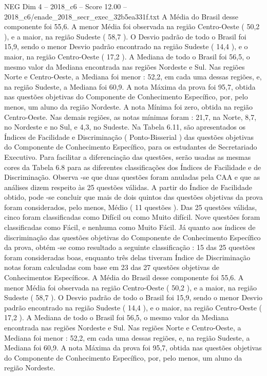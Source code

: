 \begin{textsample}{NEG Dim 4 – 2018\_c6 – Score 12.00 – 2018\_c6/enade\_2018\_secr\_exec\_32b5ea331f.txt}
A Média do Brasil desse componente foi 55,6.
A menor Média foi observada na região Centro-Oeste ( 50,2 ), e a maior, na região Sudeste ( 58,7 ).
O Desvio padrão de todo o Brasil foi 15,9, sendo o menor Desvio padrão encontrado na região Sudeste ( 14,4 ), e o maior, na região Centro-Oeste ( 17,2 ).
A Mediana de todo o Brasil foi 56,5, o mesmo valor da Mediana encontrada nas regiões Nordeste e Sul.
Nas regiões Norte e Centro-Oeste, a Mediana foi menor : 52,2, em cada uma dessas regiões, e, na região Sudeste, a Mediana foi 60,9.
A nota Máxima da prova foi 95,7, obtida nas questões objetivas do Componente de Conhecimento Específico, por, pelo menos, um aluno da região Nordeste.
A nota Mínima foi zero, obtida na região Centro-Oeste.
Nas demais regiões, as notas mínimas foram : 21,7, na Norte, 8,7, no Nordeste e no Sul, e 4,3, no Sudeste.
Na Tabela 6.11, são apresentados os Índices de Facilidade e Discriminação ( Ponto-Bisserial ) das questões objetivas do Componente de Conhecimento Específico, para os estudantes de Secretariado Executivo.
Para facilitar a diferenciação das questões, serão usadas as mesmas cores da Tabela 6.8 para as diferentes classificações dos Índices de Facilidade e de Discriminação.
Observa -se que duas questões foram anuladas pela CAA e que as análises dizem respeito às 25 questões válidas.
A partir do Índice de Facilidade obtido, pode -se concluir que mais de dois quintos das questões objetivas da prova foram considerados, pelo menos, Médio ( 11 questões ).
Das 25 questões válidas, cinco foram classificadas como Difícil ou como Muito difícil.
Nove questões foram classificadas como Fácil, e nenhuma como Muito Fácil.
Já quanto aos índices de discriminação das questões objetivas do Componente de Conhecimento Específico da prova, obtém -se como resultado a seguinte classificação : 15 das 25 questões foram consideradas boas, enquanto três delas tiveram Índice de Discriminação notas foram calculadas com base em 23 das 27 questões objetivas de Conhecimentos Específicos.
A Média do Brasil desse componente foi 55,6.
A menor Média foi observada na região Centro-Oeste ( 50,2 ), e a maior, na região Sudeste ( 58,7 ).
O Desvio padrão de todo o Brasil foi 15,9, sendo o menor Desvio padrão encontrado na região Sudeste ( 14,4 ), e o maior, na região Centro-Oeste ( 17,2 ).
A Mediana de todo o Brasil foi 56,5, o mesmo valor da Mediana encontrada nas regiões Nordeste e Sul.
Nas regiões Norte e Centro-Oeste, a Mediana foi menor : 52,2, em cada uma dessas regiões, e, na região Sudeste, a Mediana foi 60,9.
A nota Máxima da prova foi 95,7, obtida nas questões objetivas do Componente de Conhecimento Específico, por, pelo menos, um aluno da região Nordeste.

\end{textsample}

